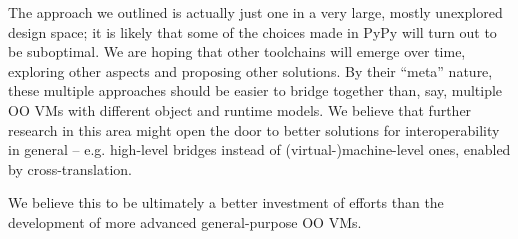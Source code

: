 \documentclass{llncs}
\begin{document}
The approach we outlined is actually just one in a very large, mostly
unexplored design space; it is likely that some of the choices made in
PyPy will turn out to be suboptimal.  We are hoping that other
toolchains will emerge over time, exploring other aspects and proposing
other solutions.  By their ``meta'' nature, these multiple approaches
should be easier to bridge together than, say, multiple OO VMs with
different object and runtime models.  We believe that further research
in this area might open the door to better solutions for
interoperability in general -- e.g. high-level bridges instead of
(virtual-)machine-level ones, enabled by cross-translation.

We believe this to be ultimately a better investment of efforts than the
development of more advanced general-purpose OO VMs.




\end{document}
